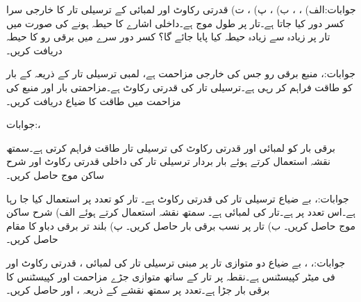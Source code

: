 جوابات:الف) ، ،  ب) ،  پ) ،  ت) 
قدرتی رکاوٹ  اور لمبائی  کے ترسیلی تار کا خارجی سرا کسر دور کیا جاتا ہے۔تار پر طول موج  ہے۔داخلی اشارے کا حیطہ  ہونے کی صورت میں تار پر زیادہ سے زیادہ حیطہ کیا پایا جائے گا؟ کسر دور سرے میں برقی رو کا حیطہ دریافت کریں۔

جوابات:، 
منبع برقی رو  جس کی خارجی مزاحمت  ہے،  لمبی ترسیلی تار کے ذریعہ  کے بار کو طاقت فراہم کر رہی ہے۔ترسیلی تار کی قدرتی رکاوٹ  ہے۔مزاحمتی بار اور منبع کی مزاحمت میں طاقت کا ضیاع دریافت کریں۔

جوابات:، 

برقی بار  کو  لمبائی اور  قدرتی رکاوٹ کی ترسیلی تار طاقت فراہم کرتی ہے۔سمتھ نقشہ استعمال کرتے ہوئے بار بردار ترسیلی تار کی داخلی قدرتی رکاوٹ  اور شرح ساکن موج  حاصل کریں۔

جوابات:، 
بے ضیاع ترسیلی تار کی قدرتی رکاوٹ   ہے۔ تار کو  تعدد پر استعمال کیا جا رہا ہے۔اس
 تعدد پر  ہے۔تار کی لمبائی  ہے۔ سمتھ نقشہ استعمال کرتے ہوئے  الف) شرح ساکن موج حاصل کریں۔ ب) تار پر نسب برقی بار  حاصل کریں۔ پ) بلند تر برقی دباو کا مقام حاصل کریں۔

جوابات:، ، 
بے ضیاع دو متوازی تار پر مبنی ترسیلی تار کی لمبائی ، قدرتی رکاوٹ  اور فی میٹر کپیسٹنس  ہے۔نقطہ  پر تار کے ساتھ متوازی جڑے مزاحمت  اور کپیسٹنس  کا برقی بار جڑا ہے۔تعدد  پر سمتھ نقشے کے ذریعہ ،  اور  حاصل کریں۔

